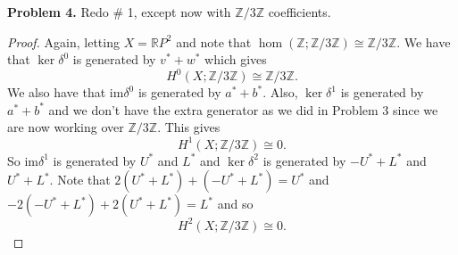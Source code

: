\documentclass[leqno]{article}
\theoremstyle{nonumberplain}
\newtheorem{proof}{Proof}
\newcommand{\im}{\mathrm{im}}
\newcommand{\R}{\mathbb{R}}
\newcommand{\Z}{\mathbb{Z}}
\begin{document}
\vspace*{1cm}


\noindent\textbf{Problem 4.} 
Redo \# 1, except now with $\Z/3\Z$ coefficients.

\begin{proof}
Again, letting $X=\R P^2$ and note that $\hom(\Z;\Z/3\Z) \cong \Z/3\Z$. We have that $\ker \delta^0$ is generated by $v^*+w^*$ which gives
\[
H^0(X; \Z/3\Z) \cong \Z/3\Z.
\]
We also have that $\im \delta^0$ is generated by $a^*+b^*$.  Also, $\ker \delta^1$ is generated by $a^*+b^*$ and we don't have the extra generator as we did in Problem 3 since we are now working over $\Z/3\Z$. This gives
\[
H^1(X;\Z/3\Z)\cong 0.
\]
So $\im \delta^1$ is generated by $U^*$ and $L^*$ and $\ker \delta^2$ is generated by $-U^*+L^*$ and $U^*+L^*$. Note that $2(U^*+L^*)+(-U^*+L^*)=U^*$ and $-2(-U^*+L^*)+2(U^*+L^*)=L^*$ and so 
\[
H^2(X;\Z/3\Z)\cong 0.
\]

\end{proof}
\end{document}
